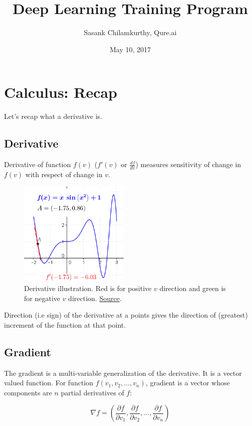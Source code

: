 \documentclass[a4paper]{tufte-handout}
\title{Deep Learning Training Program}
\author{Sasank Chilamkurthy, Qure.ai}
\date{May 10, 2017}
\begin{document}
\maketitle
\tableofcontents

\section{Calculus: Recap}\label{calculus-recap}

Let's recap what a derivative is.

\subsection{Derivative}\label{derivative}

Derivative of function \(f(v)\) (\(f'(v)\) or \(\frac{df}{dv}\))
measures sensitivity of change in \(f(v)\) with respect of change in
\(v\).

\begin{figure}
  \includegraphics[height=50mm]{differential.png}
  \caption{Derivative illustration. Red is for positive \(v\)
direction and green is for negative \(v\) direction.
\href{https://en.wikipedia.org/wiki/Derivative}{Source}.}
\end{figure}

Direction (i.e sign) of the derivative at a points gives the direction
of (greatest) increment of the function at that point.

\subsection{Gradient}\label{gradient}

The gradient is a multi-variable generalization of the derivative. It is
a vector valued function. For function \(f(v_1, v_2, \ldots, v_n)\),
gradient is a vector whose components are \(n\) partial derivatives of
\(f\):

\[ \nabla f = (\frac{\partial f}{\partial v_1 }, \frac{\partial f}{\partial v_2 }, \ldots, \frac{\partial f}{\partial v_n })\]
\end{document}
